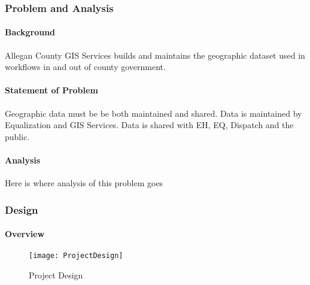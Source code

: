 %
%
\subsubsection{Problem and Analysis}
%
\begin{adjmulticols}{2}{\innerMar}{\outerMar}
\paragraph{Background}
%
\noindent Allegan County GIS Services builds and maintains the geographic dataset used in workflows in and out of county government.
%
\paragraph{Statement of Problem}
%
\noindent Geographic data must be be both maintained and shared.  Data is maintained by Equalization and GIS Services.  Data is shared with EH, EQ, Dispatch and the public.
%
\paragraph{Analysis}
%
\noindent Here is where analysis of this problem goes
%
\end{adjmulticols}
%
\clearpage
\subsubsection{Design}

\paragraph[Overview]{Overview}


%
\vspace{-.2in}

\begin{figure}[h!]
\centering
    \texttt{[image: ProjectDesign]}
\vspace{-.2in}

\caption{Project Design}
\end{figure}
\clearpage








